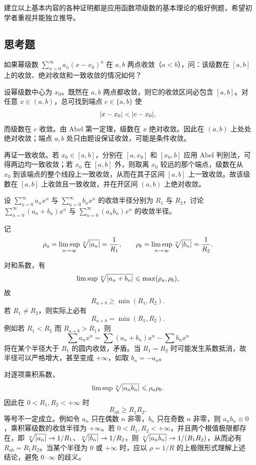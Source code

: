 建立以上基本内容的各种证明都是应用函数项级数的基本理论的极好例题，希望初学者重视并能独立推导。

\subsection{思考题}

\begin{xthought}[1]
如果幂级数 $\displaystyle\sum_{n=0}^{\infty}a_n(x-x_0)^n$ 在 $a,b$ 两点收敛（$a<b$），问：该级数在 $[a,b]$ 上的收敛、绝对收敛和一致收敛的情况如何？
\end{xthought}
\begin{xsolution}
设幂级数中心为 $x_0$。既然在 $a,b$ 两点都收敛，则它的收敛区间必包含 $[a,b]$。对任意 $x\in(a,b)$，总可找到端点 $c\in\{a,b\}$ 使
\[
  \lvert x-x_0\rvert<\lvert c-x_0\rvert,
\]
而级数在 $c$ 收敛。由 Abel 第一定理，级数在 $x$ 绝对收敛。因此在 $(a,b)$ 上处处绝对收敛；端点 $a,b$ 处只由题设保证收敛，可能是条件收敛。

再证一致收敛。若 $x_0\in[a,b]$，分别在 $[a,x_0]$ 和 $[x_0,b]$ 应用 Abel 判别法，可得两边均一致收敛；若 $x_0$ 在 $[a,b]$ 外，则取离 $x_0$ 较远的那个端点，级数在从 $x_0$ 到该端点的整个线段上一致收敛，从而在其子区间 $[a,b]$ 上一致收敛。故该级数在 $[a,b]$ 上收敛且一致收敛，并在开区间 $(a,b)$ 上绝对收敛。
\end{xsolution}


\begin{xthought}[2]
设 $\displaystyle\sum_{n=0}^{\infty}a_nx^n$ 与 $\displaystyle\sum_{n=0}^{\infty}b_nx^n$ 的收敛半径分别为 $R_1$ 与 $R_2$，讨论 $\displaystyle\sum_{n=0}^{\infty}(a_n+b_n)x^n$ 与 $\displaystyle\sum_{n=0}^{\infty}(a_nb_n)x^n$ 的收敛半径。
\end{xthought}
\begin{xsolution}
记
\[
  \rho_a=\limsup_{n\to\infty}\sqrt[n]{\lvert a_n\rvert}=\frac1{R_1},
  \qquad
  \rho_b=\limsup_{n\to\infty}\sqrt[n]{\lvert b_n\rvert}=\frac1{R_2}.
\]

对和系数，有
\[
  \limsup\sqrt[n]{\lvert a_n+b_n\rvert}
  \leqslant\max(\rho_a,\rho_b),
\]
故
\[
  R_{a+b}\geqslant\min(R_1,R_2).
\]
若 $R_1\ne R_2$，则实际上必有
\[
  R_{a+b}=\min(R_1,R_2).
\]
例如若 $R_1<R_2$ 而 $R_{a+b}>R_1$，则
\[
  \sum a_nx^n=\sum(a_n+b_n)x^n-\sum b_nx^n
\]
将在某个半径大于 $R_1$ 的圆内收敛，矛盾。当 $R_1=R_2$ 时可能发生系数抵消，故半径可以严格增大，甚至变成 $+\infty$，如取 $b_n=-a_n$。

对逐项乘积系数，
\[
  \limsup\sqrt[n]{\lvert a_nb_n\rvert}
  \leqslant\rho_a\rho_b.
\]
因此在 $0<R_1,R_2<+\infty$ 时
\[
  R_{ab}\geqslant R_1R_2.
\]
等号不一定成立。例如令 $a_n$ 只在偶数 $n$ 非零，$b_n$ 只在奇数 $n$ 非零，则 $a_nb_n\equiv0$，乘积幂级数的收敛半径为 $+\infty$。若 $0<R_1,R_2<+\infty$，并且两个根值极限都存在，即 $\sqrt[n]{\lvert a_n\rvert}\to1/R_1$、$\sqrt[n]{\lvert b_n\rvert}\to1/R_2$，则 $\sqrt[n]{\lvert a_nb_n\rvert}\to1/(R_1R_2)$，从而必有 $R_{ab}=R_1R_2$。当某个半径为 $0$ 或 $+\infty$ 时，应以 $\rho=1/R$ 的上极限形式理解上述结论，避免 $0\cdot\infty$ 的歧义。
\end{xsolution}


